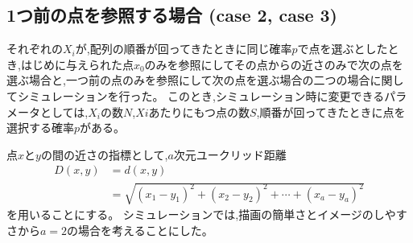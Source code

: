 \subsection{1つ前の点を参照する場合 (case 2, case 3)}

それぞれの$X_{i}$が,配列の順番が回ってきたときに同じ確率$p$で点を選ぶとしたとき,はじめに与えられた点$x_{0}$のみを参照にしてその点からの近さのみで次の点を選ぶ場合と,一つ前の点のみを参照にして次の点を選ぶ場合の二つの場合に関してシミュレーションを行った。
このとき,シミュレーション時に変更できるパラメータとしては,$X_{i}$の数$N$,$X{i}$あたりにもつ点の数$S$,順番が回ってきたときに点を選択する確率$p$がある。

点$x$と$y$の間の近さの指標として,$a$次元ユークリッド距離
\begin{align}D(x, y) &= d(x,y) \nonumber\\
&= \sqrt{(x_{1} - y_{1})^{2} + (x_{2} - y_{2})^{2} + \cdots + (x_{a} - y_{a})^{2}}\end{align}
を用いることにする。
シミュレーションでは,描画の簡単さとイメージのしやすさから$a=2$の場合を考えることにした。

